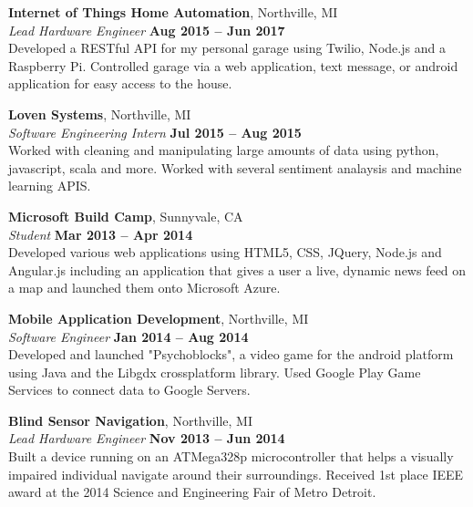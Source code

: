 \documentclass[margin,line]{resume}
\begin{document}
\begin{resume}
	\textbf{Internet of Things Home Automation}, Northville, MI \vspace{2mm}\\\vspace{1mm}%
	\textsl{Lead Hardware Engineer} \hfill \textbf{Aug 2015 -- Jun 2017}\\
	Developed a RESTful API for my personal garage using Twilio, Node.js and a Raspberry Pi. Controlled garage via a web application, text message, or android application for easy access to the house. 

    \textbf{Loven Systems}, Northville, MI \vspace{2mm}\\\vspace{1mm}%
    \textsl{Software Engineering Intern} \hfill \textbf{Jul 2015 -- Aug 2015}\\
	Worked with cleaning and manipulating large amounts of data using python, javascript, scala and more. Worked with several sentiment analaysis and machine learning APIS.

    \textbf{Microsoft Build Camp}, Sunnyvale, CA \vspace{2mm}\\\vspace{1mm}%
    \textsl{Student} \hfill \textbf{Mar 2013 -- Apr 2014}\\
     Developed various web applications using HTML5, CSS, JQuery, Node.js and Angular.js including an application that gives a user a live, dynamic news feed on a map and launched them onto Microsoft Azure. 
 
    \textbf{Mobile Application Development}, Northville, MI \vspace{2mm}\\\vspace{1mm}%
    \textsl{Software Engineer} \hfill \textbf{Jan 2014 -- Aug 2014}\\
	Developed and launched "Psychoblocks", a video game for the android platform using Java and the Libgdx cross­platform library. Used Google Play Game Services to connect data to Google Servers.
	
    \textbf{Blind Sensor Navigation}, Northville, MI \vspace{2mm}\\\vspace{1mm}%
	\textsl{Lead Hardware Engineer} \hfill \textbf{Nov 2013 -- Jun 2014}\\
	Built a device running on an ATMega328p micro­controller that helps a visually impaired individual navigate around their surroundings. Received 1st place IEEE award at the 2014 Science and Engineering Fair of Metro Detroit.
	



\end{resume}
\end{document}
